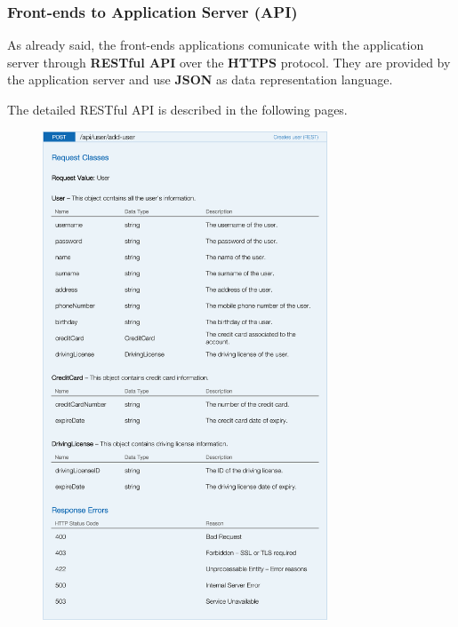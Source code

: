 \subsubsection{Front-ends to Application Server (API)}

As already said, the front-ends applications comunicate with the application server through \textbf{RESTful API} over the \textbf{HTTPS} protocol. They are provided by the application server and use \textbf{JSON} as data representation language.

The detailed RESTful API is described in the following pages.

\begin{figure}[H]
	\noindent
    	\centering
    	\includegraphics[height=550px, keepaspectratio]{apitables/APIAddUser.png}
    	\label{fig:api-add-user}
\end{figure}

